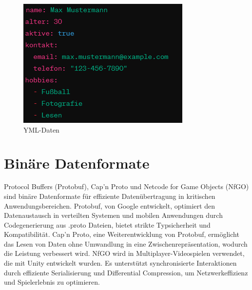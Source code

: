 \begin{figure}[h]
\begin{minipage}{0.32\textwidth}
		\includegraphics[width=\textwidth]{figures/ymlexample.png}
		\caption{YML-Daten}
		\label{fig:yaml}
	\end{minipage}
\end{figure}

\newpage

\section{Binäre Datenformate}

Protocol Buffers (Protobuf), Cap'n Proto und Netcode for Game Objects (NfGO) sind  binäre Datenformate für effiziente Datenübertragung in kritischen Anwendungsbereichen. Protobuf, von Google entwickelt, optimiert den Datenaustausch in verteilten Systemen und mobilen Anwendungen durch Codegenerierung aus .proto Dateien, bietet strikte Typsicherheit und Kompatibilität. Cap'n Proto, eine Weiterentwicklung von Protobuf, ermöglicht das Lesen von Daten ohne Umwandlung in eine Zwischenrepräsentation, wodurch die Leistung verbessert wird. NfGO wird in Multiplayer-Videospielen verwendet, die mit Unity entwickelt wurden. Es unterstützt synchronisierte Interaktionen durch effiziente Serialisierung und Differential Compression, um Netzwerkeffizienz und Spielerlebnis zu optimieren.

